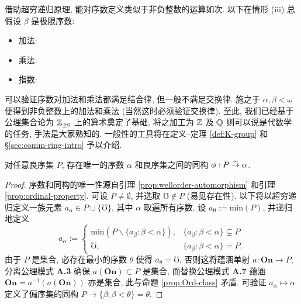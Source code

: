 借助超穷递归原理, 能对序数定义类似于非负整数的运算如次. 以下在情形 (iii) 总假设 $\beta$ 是极限序数:
\begin{itemize}
	\item 加法: \begin{inparaenum}[(i)] \item $\alpha + 0 := \alpha$,  \item $\alpha + (\beta + 1) = (\alpha + \beta) + 1$, \item $\alpha + \beta = \sup\{ \alpha + \xi : \xi < \beta\}$. \end{inparaenum}
	\item 乘法: \begin{inparaenum}[(i)] \item $\alpha \cdot 0 := 0$, \item $\alpha \cdot (\beta + 1) = \alpha \cdot \beta + \alpha$, \item $\alpha \cdot \beta = \sup\{\alpha \cdot \xi : \xi < \beta\}$. \end{inparaenum}
	\item 指数: \begin{inparaenum}[(i)] \item $\alpha^0 := 1$, \item $\alpha^{\beta + 1} = \alpha^\beta \cdot \alpha$, \item $\alpha^\beta = \sup\{\alpha^\xi : \xi < \beta\}$. \end{inparaenum}
\end{itemize}
可以验证序数对加法和乘法都满足结合律, 但一般不满足交换律. 施之于 $\alpha, \beta < \omega$ 便得到非负整数上的加法和乘法 (当然这时必须验证交换律). 至此, 我们已经基于公理集合论为 $\mathbb{Z}_{\geq 0}$ 上的算术奠定了基础, 将之加工为 $\mathbb{Z}$ 及 $\mathbb{Q}$ 则可以说是代数学的任务, 手法是大家熟知的. 一般性的工具将在定义--定理 \ref{def:K-group} 和 \S\ref{sec:comm-ring-intro} 予以介绍.

\begin{proposition}\label{prop:ordinal-ordertype}
	对任意良序集 $P$, 存在唯一的序数 $\alpha$ 和良序集之间的同构 $\phi: P \stackrel{\sim}{\rightarrow} \alpha$.
\end{proposition}
\begin{proof}
	序数和同构的唯一性源自引理 \ref{prop:wellorder-automorphism} 和引理 \ref{prop:ordinal-property}. 可设 $P \neq \emptyset$, 并选取 $\mho \notin P$ (易见存在性). 以下将以超穷递归定义一族元素 $a_\alpha \in P \sqcup \{\mho\}$, 其中 $\alpha$ 取遍所有序数. 设 $a_0 := \text{min}(P)$, 并递归地定义
	\[ a_\alpha := \begin{cases}
		\text{min}\left( P \smallsetminus \{a_\beta : \beta < \alpha \} \right), & \{a_\beta : \beta < \alpha \} \subsetneq P \\
		\mho, & \{a_\beta : \beta < \alpha \} = P.
	\end{cases}\]
	由于 $P$ 是集合, 必存在最小的序数 $\theta$ 使得 $a_\theta = \mho$, 否则这将蕴涵单射 $a: \textbf{On} \to P$, 分离公理模式 \textbf{A.3} 确保 $a(\textbf{On}) \subset P$ 是集合, 而替换公理模式 \textbf{A.7} 蕴涵 $\textbf{On} = a^{-1}(a(\textbf{On}))$ 亦是集合, 此与命题 \ref{prop:Ord-class} 矛盾. 可验证 $a_\alpha \mapsto \alpha$ 定义了偏序集的同构 $P \to \{\beta : \beta < \theta\} = \theta$.
\end{proof}

